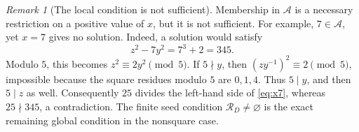 \documentclass[a4paper,11pt]{amsart}
\numberwithin{equation}{section}
\theoremstyle{definition}
\theoremstyle{remark}
\newtheorem{remark}[theorem]{Remark}
\newcommand{\Acal}{\mathcal A}
\newcommand{\Rcal}{\mathcal R}
\begin{document}
\begin{remark}[The local condition is not sufficient]\label{rem:x7}
Membership in \(\Acal\) is a necessary restriction on a positive value of
\(x\), but it is not sufficient.  For example, \(7\in\Acal\), yet \(x=7\)
gives no solution.  Indeed, a solution would satisfy
\begin{equation}\label{eq:x7}
 z^2-7y^2=7^3+2=345.
\end{equation}
Modulo \(5\), this becomes \(z^2\equiv2y^2\pmod5\).  If \(5\nmid y\), then
\((zy^{-1})^2\equiv2\pmod5\), impossible because the square residues modulo
\(5\) are \(0,1,4\).  Thus \(5\mid y\), and then \(5\mid z\) as well.
Consequently \(25\) divides the left-hand side of \eqref{eq:x7}, whereas
\(25\nmid345\), a contradiction.  The finite seed condition
\(\Rcal_D\neq\varnothing\) is the exact remaining global condition in the
nonsquare case.
\end{remark}
\end{document}
